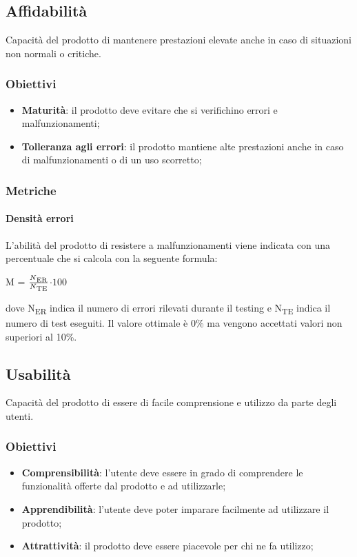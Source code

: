 	\subsection{Affidabilità}
	Capacità del prodotto di mantenere prestazioni elevate anche in caso di situazioni non normali o critiche.
		\subsubsection{Obiettivi}
		\begin{itemize}
			\item \textbf{Maturità}: il prodotto deve evitare che si verifichino errori e malfunzionamenti;
			\item \textbf{Tolleranza agli errori}: il prodotto mantiene alte prestazioni anche in caso di malfunzionamenti o di un uso scorretto;
		\end{itemize}
		\subsubsection{Metriche}
			\paragraph{Densità errori}
			L'abilità del prodotto di resistere a malfunzionamenti viene indicata con una percentuale che si calcola con la seguente formula: \\
			\centerline{ M =  \(\frac{N\textsubscript{ER}}{N\textsubscript{TE}} \)$ \cdot 100$ }
			dove N\textsubscript{ER} indica il numero di errori rilevati durante il testing e N\textsubscript{TE} indica il numero di test eseguiti. Il valore ottimale è 0\% ma vengono accettati valori non superiori al 10\%.
	\subsection{Usabilità}
	Capacità del prodotto di essere di facile comprensione e utilizzo da parte degli utenti.
		\subsubsection{Obiettivi}
		\begin{itemize}
			\item \textbf{Comprensibilità}: l'utente deve essere in grado di comprendere le funzionalità offerte dal prodotto e ad utilizzarle;
			\item \textbf{Apprendibilità}: l'utente deve poter imparare facilmente ad utilizzare il prodotto;
			\item \textbf{Attrattività}: il prodotto deve essere piacevole per chi ne fa utilizzo;
		\end{itemize}

